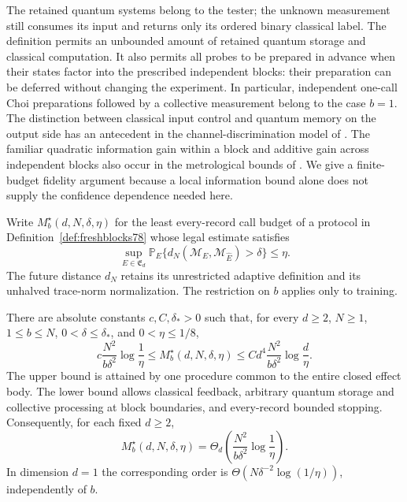 The retained quantum systems belong to the tester; the unknown
measurement still consumes its input and returns only its ordered binary
classical label.  The definition permits an unbounded amount of retained
quantum storage and classical computation.  It also permits all probes to be prepared
in advance when their states factor into the prescribed independent
blocks: their preparation can be deferred without changing the
experiment.  In particular, independent one-call Choi preparations
followed by a collective measurement belong to the case $b=1$.
The distinction between classical input control and quantum memory on
the output side has an antecedent in the channel-discrimination model
of \cite[Section~II.2]{SHW68}.  The familiar quadratic information gain
within a block and additive gain across independent blocks also occur
in the metrological bounds of \cite{Hyllus78,Toth78}.  We give a
finite-budget fidelity argument because a local information bound alone
does not supply the confidence dependence needed here.

Write $M_b^\star(d,N,\delta,\eta)$ for the least every-record call
budget of a protocol in Definition~\ref{def:freshblocks78} whose legal
estimate satisfies
\begin{equation}\label{eq:blockrisk78}
 \sup_{E\in\mathfrak E_d}
 \mathbb P_E\{d_N(\mathcal M_E,\mathcal M_{\widehat E})>\delta\}
 \le\eta.
\end{equation}
The future distance $d_N$ retains its unrestricted adaptive definition
and its unhalved trace-norm normalization.  The restriction on $b$
applies only to training.

\begin{theorem}
\label{thm:blocklearning78}
There are absolute constants $c,C,\delta_*>0$ such that, for every
$d\ge2$, $N\ge1$, $1\le b\le N$, $0<\delta\le\delta_*$, and
$0<\eta\le1/8$,
\begin{equation}\label{eq:blockcalls78}
 c\frac{N^2}{b\delta^2}\log\frac1\eta
 \le M_b^\star(d,N,\delta,\eta)
 \le C d^4\frac{N^2}{b\delta^2}\log\frac d\eta.
\end{equation}
The upper bound is attained by one procedure common to the entire
closed effect body.  The lower bound allows classical feedback,
arbitrary quantum storage and collective processing at block
boundaries, and every-record bounded stopping.  Consequently, for
each fixed $d\ge2$,
\begin{equation}\label{eq:blockminimax78}
 M_b^\star(d,N,\delta,\eta)
 =\Theta_d\!\left(\frac{N^2}{b\delta^2}\log\frac1\eta\right).
\end{equation}
In dimension $d=1$ the corresponding order is
$\Theta(N\delta^{-2}\log(1/\eta))$, independently of $b$.
\end{theorem}

